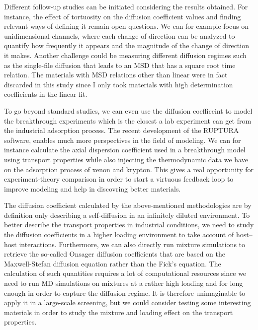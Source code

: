 \documentclass[main]{subfiles}
\begin{document}
Different follow-up studies can be initiated considering the results obtained. For instance, the effect of tortuosity on the diffusion coefficient values and finding relevant ways of defining it remain open questions. We can for example focus on unidimensional channels, where each change of direction can be analyzed to quantify how frequently it appears and the magnitude of the change of direction it makes.\autocite{Bullitt_2003} Another challenge could be measuring different diffusion regimes such as the single-file diffusion that leads to an MSD that has a square root time relation\autocite{Lin_2005}. The materials with MSD relations other than linear were in fact discarded in this study since I only took materials with high determination coefficients in the linear fit. 

To go beyond standard studies, we can even use the diffusion coefficeint to model the breakthrough experiments which is the closest a lab experiment can get from the industrial adsorption process. The recent development of the RUPTURA software,\autocite{Sharma_2023} enables much more perspectives in the field of modeling. We can for instance calculate the axial dispersion coefficient used in a breakthrough model using transport properties while also injecting the thermodynamic data we have on the adsorption process of xenon and krypton. This gives a real opportunity for experiment-theory comparison in order to start a virtuous feedback loop to improve modeling and help in discovring better materials. 

The diffusion coefficient calculated by the above-mentioned methodologies are by definition only describing a self-diffusion in an infinitely diluted environment. To better describe the transport properties in industrial conditions, we need to study the diffusion coefficients in a higher loading environment to take account of host--host interactions. Furthermore, we can also directly run mixture simulations to retrieve the so-called Onsager diffusion coefficients that are based on the Maxwell-Stefan diffusion equation rather than the Fick's equation.\autocite{Krishna_2008} The calculation of such quantities requires a lot of computational resources since we need to run MD simulations on mixtures at a rather high loading and for long enough in order to capture the diffusion regime. It is therefore unimaginable to apply it in a large-scale screening, but we could consider testing some interesting materials in order to study the mixture and loading effect on the transport properties.
\end{document}
